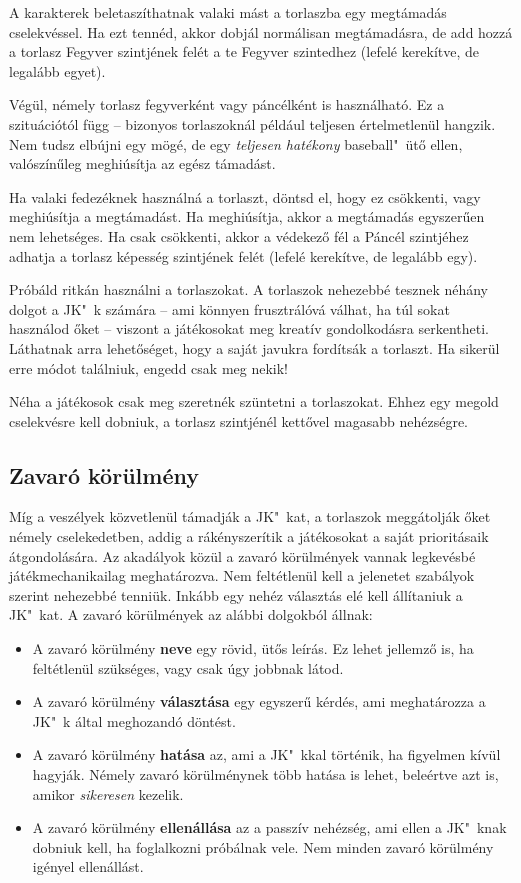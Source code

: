 A karakterek beletaszíthatnak valaki mást a torlaszba egy megtámadás cselekvéssel. Ha ezt tennéd, akkor dobjál normálisan megtámadásra, de add hozzá a torlasz Fegyver szintjének felét a te Fegyver szintedhez (lefelé kerekítve, de legalább egyet).

Végül, némely torlasz fegyverként vagy páncélként is használható. Ez a szituációtól függ – bizonyos torlaszoknál például teljesen értelmetlenül hangzik. Nem tudsz elbújni egy  mögé, de egy  \emph{teljesen hatékony} baseball"~ütő ellen, valószínűleg meghiúsítja az egész támadást.

Ha valaki fedezéknek használná a torlaszt, döntsd el, hogy ez csökkenti, vagy meghiúsítja a megtámadást. Ha meghiúsítja, akkor a megtámadás egyszerűen nem lehetséges. Ha csak csökkenti, akkor a védekező fél a Páncél szintjéhez adhatja a torlasz képesség szintjének felét (lefelé kerekítve, de legalább egy).

Próbáld ritkán használni a torlaszokat. A torlaszok nehezebbé tesznek néhány dolgot a JK"~k számára – ami könnyen frusztrálóvá válhat, ha túl sokat használod őket – viszont a játékosokat meg kreatív gondolkodásra serkentheti. Láthatnak arra lehetőséget, hogy a saját javukra fordítsák a torlaszt. Ha sikerül erre módot találniuk, engedd csak meg nekik!

Néha a játékosok csak meg szeretnék szüntetni a torlaszokat. Ehhez egy megold cselekvésre kell dobniuk, a torlasz szintjénél kettővel magasabb nehézségre.

\newpage

\subsection{Zavaró körülmény}

Míg a veszélyek közvetlenül támadják a JK"~kat, a torlaszok meggátolják őket némely cselekedetben, addig a  rákényszerítik a játékosokat a saját prioritásaik átgondolására. Az akadályok közül a zavaró körülmények vannak legkevésbé játékmechanikailag meghatározva. Nem feltétlenül kell a jelenetet szabályok szerint nehezebbé tenniük. Inkább egy nehéz választás elé kell állítaniuk a JK"~kat. A zavaró körülmények az alábbi dolgokból állnak:

\begin{itemize}
    \item A zavaró körülmény \textbf{neve} egy rövid, ütős leírás. Ez lehet jellemző is, ha feltétlenül szükséges, vagy csak úgy jobbnak látod.
    \item A zavaró körülmény \textbf{választása} egy egyszerű kérdés, ami meghatározza a JK"~k által meghozandó döntést.
    \item A zavaró körülmény \textbf{hatása} az, ami a JK"~kkal történik, ha figyelmen kívül hagyják. Némely zavaró körülménynek több hatása is lehet, beleértve azt is, amikor \emph{sikeresen} kezelik.
    \item A zavaró körülmény \textbf{ellenállása} az a passzív nehézség, ami ellen a JK"~knak dobniuk kell, ha foglalkozni próbálnak vele. Nem minden zavaró körülmény igényel ellenállást.
\end{itemize}


